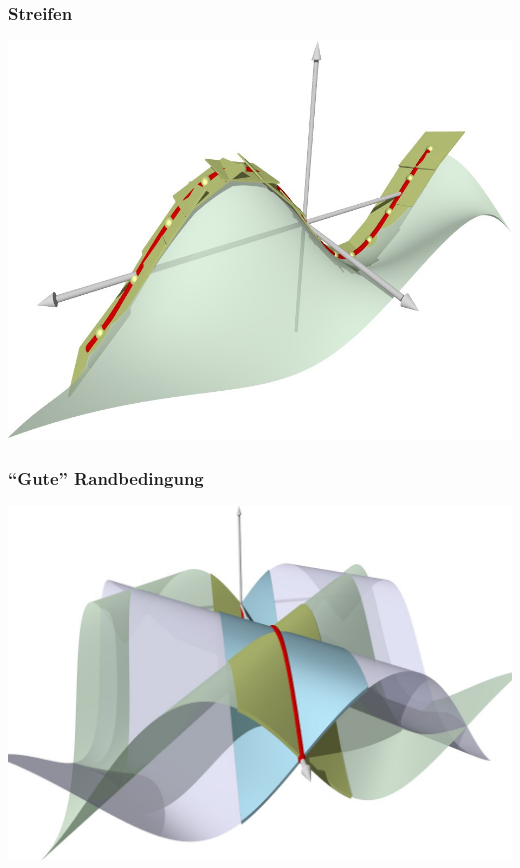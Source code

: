 \begin{frame}
\frametitle{Streifen}
\begin{center}
\includegraphics[width=\hsize]{../../common/3d/streifen0.jpg}
\end{center}
\end{frame}

\begin{frame}
\frametitle{``Gute'' Randbedingung}
\begin{center}
\includegraphics[width=\hsize]{../../common/3d/streifen2.jpg}
\end{center}
\end{frame}

